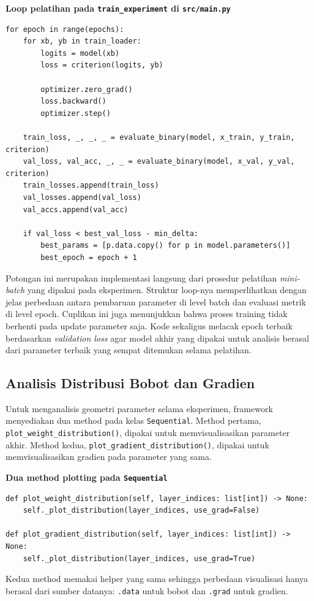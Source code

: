 \documentclass{article}
\begin{document}
\noindent\textbf{Loop pelatihan pada \texttt{train\_experiment} di \texttt{src/main.py}}\par
\begin{lstlisting}
for epoch in range(epochs):
    for xb, yb in train_loader:
        logits = model(xb)
        loss = criterion(logits, yb)

        optimizer.zero_grad()
        loss.backward()
        optimizer.step()

    train_loss, _, _, _ = evaluate_binary(model, x_train, y_train, criterion)
    val_loss, val_acc, _, _ = evaluate_binary(model, x_val, y_val, criterion)
    train_losses.append(train_loss)
    val_losses.append(val_loss)
    val_accs.append(val_acc)

    if val_loss < best_val_loss - min_delta:
        best_params = [p.data.copy() for p in model.parameters()]
        best_epoch = epoch + 1
\end{lstlisting}
Potongan ini merupakan implementasi langsung dari prosedur pelatihan \textit{mini-batch} yang dipakai pada eksperimen. Struktur loop-nya memperlihatkan dengan jelas perbedaan antara pembaruan parameter di level batch dan evaluasi metrik di level epoch. Cuplikan ini juga menunjukkan bahwa proses training tidak berhenti pada update parameter saja. Kode sekaligus melacak epoch terbaik berdasarkan \textit{validation loss} agar model akhir yang dipakai untuk analisis berasal dari parameter terbaik yang sempat ditemukan selama pelatihan.

\subsection{Analisis Distribusi Bobot dan Gradien}
\label{subsec:distplot}
Untuk menganalisis geometri parameter selama eksperimen, framework menyediakan dua method pada kelas \texttt{Sequential}. Method pertama, \texttt{plot\_weight\_distribution()}, dipakai untuk memvisualisasikan parameter akhir. Method kedua, \texttt{plot\_gradient\_distribution()}, dipakai untuk memvisualisasikan gradien pada parameter yang sama.

\noindent\textbf{Dua method plotting pada \texttt{Sequential}}\par
\begin{lstlisting}
def plot_weight_distribution(self, layer_indices: list[int]) -> None:
    self._plot_distribution(layer_indices, use_grad=False)

def plot_gradient_distribution(self, layer_indices: list[int]) -> None:
    self._plot_distribution(layer_indices, use_grad=True)
\end{lstlisting}
Kedua method memakai helper yang sama sehingga perbedaan visualisasi hanya berasal dari sumber datanya: \texttt{.data} untuk bobot dan \texttt{.grad} untuk gradien.
\end{document}
